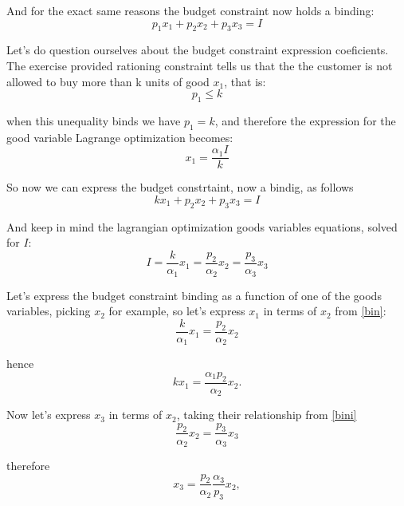 \documentclass{article}
\begin{document}
\medskip

And for the exact same reasons the budget constraint now holds a binding:
\begin{equation}\label{bin}
   p_1x_1 + p_2x_2 + p_3x_3 = I
\end{equation}

Let's do question ourselves about the budget constraint expression coeficients. The exercise provided rationing constraint tells us that the the customer is not allowed to buy more than k units of good $x_1$, that is:
\begin{equation}
  p_1 \leq k
\end{equation}

when this unequality binds we have $p_1 = k$, and therefore the expression for the good variable Lagrange optimization becomes:
\begin{equation}
  x_1 = \frac{\alpha_1 I}{k}
\end{equation}

So now we can express the budget constrtaint, now a bindig, as follows
\begin{equation}\label{binis}
   kx_1+ p_2x_2 + p_3x_3 = I
\end{equation}

And keep in mind the lagrangian optimization goods variables equations, solved for $I$:
\begin{equation}\label{bini}
  I = \frac{k}{\alpha_1}x_1 = \frac{p_2}{\alpha_2}x_2 = \frac{p_3}{\alpha_3}x_3
\end{equation}

Let's express the budget constraint binding \label{bin} as a function of one of the goods variables, picking $x_2$ for example, so let's express $x_1$ in terms of $x_2$ from \ref{bin}:
\begin{equation}
  \frac{k}{\alpha_1}x_1 = \frac{p_2}{\alpha_2}x_2
\end{equation}

hence
\begin{equation}
  kx_1 = \frac{ \alpha_1 p_2}{\alpha_2}x_2.
\end{equation}

Now let's express $x_3$ in terms of $x_2$, taking their relationship from \ref{bini}
\begin{equation}
  \frac{p_2}{\alpha_2}x_2 = \frac{p_3}{\alpha_3}x_3
\end{equation}

therefore
\begin{equation}
  x_3 = \frac{p_2}{\alpha_2}\frac{\alpha_3}{p_3}x_2,
\end{equation}
\end{document}
